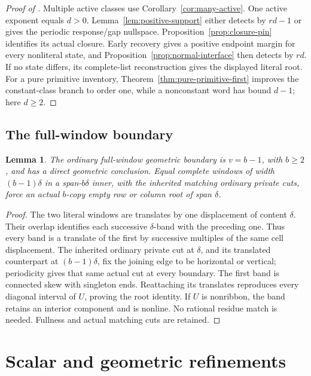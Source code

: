 \documentclass[11pt,a4paper]{amsart}
\numberwithin{equation}{section}
\theoremstyle{plain}
\newtheorem{lemma}[theorem]{Lemma}
\theoremstyle{definition}
\begin{document}
\begin{proof}[Proof of ]
Multiple active classes use Corollary~\ref{cor:many-active}.  One active exponent equals \(d>0\).  Lemma~\ref{lem:positive-support} either detects by \(rd-1\) or gives the periodic response/gap nullspace.  Proposition~\ref{prop:closure-pin} identifies its actual closure.  Early recovery gives a positive endpoint margin for every nonliteral state, and Proposition~\ref{prop:normal-interface} then detects by \(rd\).  If no state differs, its complete-list reconstruction gives the displayed literal root.  For a pure primitive inventory, Theorem~\ref{thm:pure-primitive-first} improves the constant-class branch to order one, while a nonconstant word has bound \(d-1\); here \(d\ge2\).

\end{proof}

\subsection{The full-window boundary}

\begin{lemma}\label{lem:boundary-full-window}
The ordinary full-window geometric boundary is \(v=b-1\), with \(b\ge2\), and has a direct geometric conclusion.  Equal complete windows of width \((b-1)\delta\) in a span-\(b\delta\) inner, with the inherited matching ordinary private cuts, force an actual \(b\)-copy empty row or column root of span \(\delta\).
\end{lemma}
\begin{proof}
The two literal windows are translates by one displacement of content \(\delta\).  Their overlap identifies each successive \(\delta\)-band with the preceding one.  Thus every band is a translate of the first by successive multiples of the same cell displacement.  The inherited ordinary private cut at \(\delta\), and its translated counterpart at \((b-1)\delta\), fix the joining edge to be horizontal or vertical; periodicity gives that same actual cut at every boundary.  The first band is connected skew with singleton ends.  Reattaching its translates reproduces every diagonal interval of \(U\), proving the root identity.  If \(U\) is nonribbon, the band retains an interior component and is nonline.  No rational residue match is needed.  Fullness and actual matching cuts are retained.
\end{proof}

\section{Scalar and geometric refinements}\label{sec:strengthening}
\end{document}
